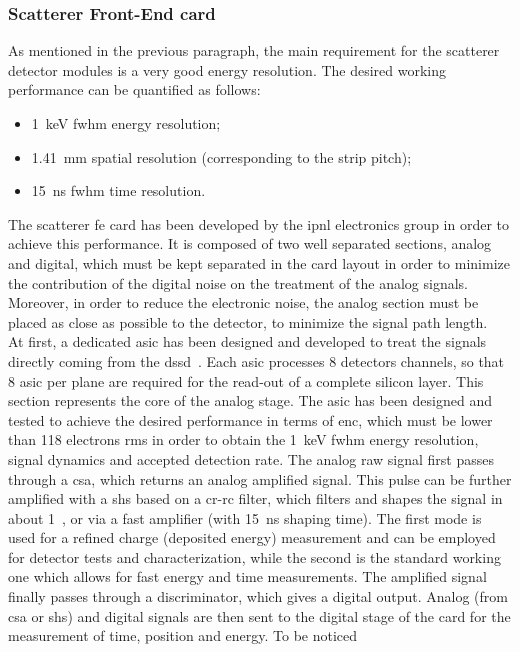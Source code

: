 \subsubsection{Scatterer Front-End card}\label{chap3::subsubsec::ScattFEcard}
As mentioned in the previous paragraph, the main requirement for the scatterer detector modules is a very good energy resolution. The desired working performance can be quantified as follows:
\begin{itemize}
\item 1~keV \gls{fwhm} energy resolution;
\item 1.41~mm spatial resolution (corresponding to the strip pitch);
\item 15~ns \gls{fwhm} time resolution.
\end{itemize} 

The scatterer \gls{fe} card has been developed by the \gls{ipnl} electronics group in order to achieve this performance. It is composed of two well separated sections, analog and digital, which must be kept separated in the card layout in order to minimize the contribution of the digital noise on the treatment of the analog signals. Moreover, in order to reduce the electronic noise, the analog section must be placed as close as possible to the detector, to minimize the signal path length.\\
At first, a dedicated \gls{asic} has been designed and developed to treat the signals directly coming from the \gls{dssd}~\parencite{Dahoumane2014}. Each \gls{asic} 
processes 8 detectors channels, so that 8 \gls{asic} per plane are required for the read-out of a complete silicon layer. This section represents the core of the analog stage. The \gls{asic} has been designed and tested to achieve the desired performance in terms of \gls{enc}, which must be lower than 118 electrons \gls{rms} in order to obtain the 1~keV \gls{fwhm} energy resolution, signal dynamics and accepted detection rate. The analog raw signal first passes through a \gls{csa}, which returns an analog amplified signal. This pulse can be further amplified with a \gls{shs} based on a \gls{cr-rc} filter, which filters and shapes the signal in about 1~\charmus, or via a fast amplifier (with 15~ns shaping time). The first mode is used for a refined charge (deposited energy) measurement and can be employed for detector tests and characterization, while the second is the standard working one which allows for fast energy and time measurements. The amplified signal finally passes through a discriminator, which gives a digital output. Analog (from \gls{csa} or \gls{shs}) and digital signals are then sent to the digital stage of the card for the measurement of time, position and energy. To be noticed \\
